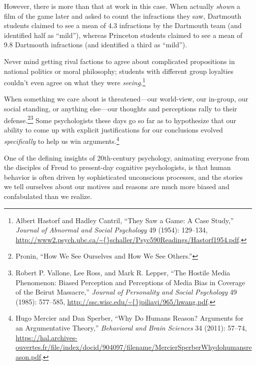 {
 However, there is more than that at work in this case. When
actually \textit{shown} a film of the game later and asked to count the
infractions they saw, Dartmouth students claimed to see a mean of 4.3
infractions by the Dartmouth team (and identified half as
``mild''), whereas Princeton
students claimed to see a mean of 9.8 Dartmouth infractions (and
identified a third as ``mild'').}

{
 Never mind getting rival factions to agree about complicated
propositions in national politics or moral philosophy; students with
different group loyalties couldn't even agree on what
they were \textit{seeing}.\footnote{Albert Hastorf and Hadley Cantril, ``They Saw
a Game: A Case Study,'' \textit{Journal of Abnormal
and Social Psychology} 49 (1954): 129--134,
\url{http://www2.psych.ubc.ca/\~{}schaller/Psyc590Readings/Hastorf1954.pdf}.}}

{
 When something we care about is threatened---our world-view, our
in-group, our social standing, or anything else---our thoughts and
perceptions rally to their defense.\footnote{Pronin, ``How We See Ourselves and How We See
Others.''}\supercomma\footnote{Robert P. Vallone, Lee Ross, and Mark R. Lepper,
``The Hostile Media Phenomenon: Biased Perception and
Perceptions of Media Bias in Coverage of the Beirut
Massacre,'' \textit{Journal of Personality and Social
Psychology} 49 (1985): 577--585,
\url{http://ssc.wisc.edu/\~{}jpiliavi/965/hwang.pdf}.} Some
psychologists these days go so far as to hypothesize that our ability
to come up with explicit justifications for our conclusions evolved
\textit{specifically} to help us win arguments.\footnote{Hugo Mercier and Dan Sperber, ``Why Do Humans
Reason? Arguments for an Argumentative Theory,''
\textit{Behavioral and Brain Sciences} 34 (2011): 57--74,
\url{https://hal.archives-ouvertes.fr/file/index/docid/904097/filename/MercierSperberWhydohumansreason.pdf}.}}

{
 One of the defining insights of 20th-century psychology, animating
everyone from the disciples of Freud to present-day cognitive
psychologists, is that human behavior is often driven by sophisticated
unconscious processes, and the stories we tell ourselves about our
motives and reasons are much more biased and confabulated than we
realize.}

